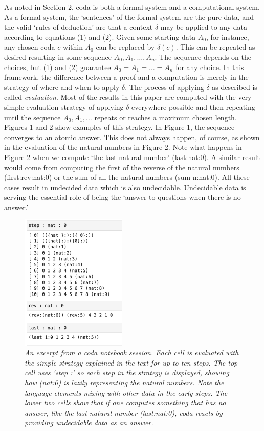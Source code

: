 \documentclass[11pt]{article}
\begin{document}
     As noted in Section 2, coda is both a formal system and a computational system.  As a formal system, the `sentences' of the formal system
are the pure data, and the valid `rules of deduction' are that a context $\delta$ may be applied to any data according to equations (1) and (2).
Given some starting data $A_0$, for instance, any chosen coda $c$ within $A_0$ can be replaced by $\delta(c)$.  This can be repeated
as desired resulting in some sequence $A_0,A_1,\dots,A_n$.  The sequence depends on the choices, but (1) and (2) guarantee 
$A_0=A_1=\dots=A_n$ for any choice.  In this framework, the difference between a proof and a computation is merely in the strategy of where and
when to apply $\delta$.  The process of applying $\delta$ as described is called {\it evaluation}.  Most of the results in this paper
are computed with the very simple evaluation strategy of applying $\delta$ everywhere possible and then repeating until the sequence 
$A_0,A_1,\dots$ repeats or reaches a maximum chosen length. 
Figures 1 and 2 show examples of this strategy.  In Figure 1, the sequence converges to an atomic answer.  This does
not always happen, of course, as shown in the evaluation of the natural numbers in Figure 2.  Note what happens in Figure 2 when we compute
`the last natural number' (last:nat:0).  A similar result would come from computing the first of the reverse of the natural numbers (first:rev:nat:0) or the sum of all
the natural numbers (sum n:nat:0).  All these cases result in undecided data which is also undecidable.  Undecidable data is serving the
essential role of being the `answer to questions when there is no answer.'

\begin{figure}[h]
\centering
\includegraphics[width=0.45\textwidth]{nat.png}
\caption{{\it An excerpt from a coda notebook session\cite{github}.  Each cell is evaluated with the simple strategy explained in the text for up to ten
steps.  The top cell uses `step :' so each step in the strategy is displayed, showing how (nat:0) is lazily representing the natural numbers.  Note the language
elements mixing with other data in the early steps. The lower two cells show that if one computes something that has no answer, like the last natural number (last:nat:0), coda reacts by providing undecidable data as an answer.}}
\end{figure}
\end{document}
